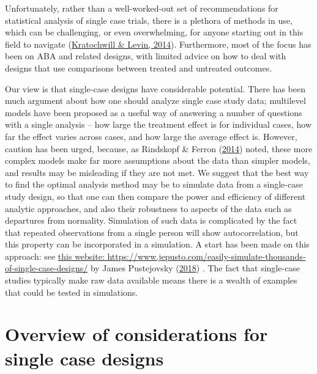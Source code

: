 \documentclass{krantz}
\begin{document}
Unfortunately, rather than a well-worked-out set of recommendations for statistical analysis of single case trials, there is a plethora of methods in use, which can be challenging, or even overwhelming, for anyone starting out in this field to navigate (\protect\hyperlink{ref-kratochwill2014c}{Kratochwill \& Levin, 2014}). Furthermore, most of the focus has been on ABA and related designs, with limited advice on how to deal with designs that use comparisons between treated and untreated outcomes.

Our view is that single-case designs have considerable potential. There has been much argument about how one should analyze single case study data; multilevel models have been proposed as a useful way of answering a number of questions with a single analysis -- how large the treatment effect is for individual cases, how far the effect varies across cases, and how large the average effect is. However, caution has been urged, because, as Rindskopf \& Ferron (\protect\hyperlink{ref-rindskopf2014}{2014}) noted, these more complex models make far more assumptions about the data than simpler models, and results may be misleading if they are not met. We suggest that the best way to find the optimal analysis method may be to simulate data from a single-case study design, so that one can then compare the power and efficiency of different analytic approaches, and also their robustness to aspects of the data such as departures from normality. Simulation of such data is complicated by the fact that repeated observations from a single person will show autocorrelation, but this property can be incorporated in a simulation. A start has been made on this approach: see \href{https://www.jepusto.com/easily-simulate-thousands-of-single-case-designs/}{this website: https://www.jepusto.com/easily-simulate-thousands-of-single-case-designs/} by James Pustejovsky (\protect\hyperlink{ref-pustejovsky2018}{2018}) . The fact that single-case studies typically make raw data available means there is a wealth of examples that could be tested in simulations.

\hypertarget{overview-of-considerations-for-single-case-designs}{%
\section{Overview of considerations for single case designs}\label{overview-of-considerations-for-single-case-designs}}
\end{document}
